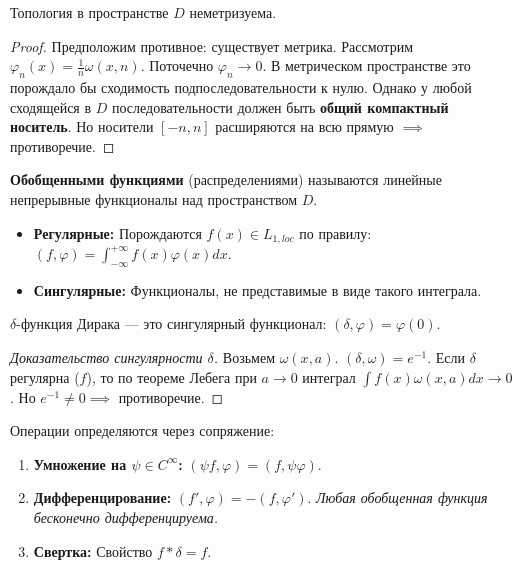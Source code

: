 \begin{proposition}[Неметризуемость]
	Топология в пространстве $D$ неметризуема.
\end{proposition}
\begin{proof}
	Предположим противное: существует метрика. Рассмотрим $\varphi_n(x) = \frac{1}{n}\omega(x, n)$. 
	Поточечно $\varphi_n \to 0$. В метрическом пространстве это порождало бы сходимость подпоследовательности к нулю. 
	Однако у любой сходящейся в $D$ последовательности должен быть \textbf{общий компактный носитель}. Но носители $[-n, n]$ расширяются на всю прямую $\implies$ противоречие.
\end{proof}

\begin{definition}
	\textbf{Обобщенными функциями} (распределениями) называются линейные непрерывные функционалы над пространством $D$.
	\begin{itemize}
		\item \textbf{Регулярные:} Порождаются $f(x) \in L_{1, loc}$ по правилу: $(f, \varphi) = \int_{-\infty}^{+\infty} f(x)\varphi(x) dx$.
		\item \textbf{Сингулярные:} Функционалы, не представимые в виде такого интеграла.
	\end{itemize}
\end{definition}

\begin{definition}
	$\delta$-функция Дирака --- это сингулярный функционал: $(\delta, \varphi) = \varphi(0)$.
\end{definition}

\begin{proof}[Доказательство сингулярности $\delta$]
	Возьмем $\omega(x, a)$. $(\delta, \omega) = e^{-1}$. 
	Если $\delta$ регулярна ($f$), то по теореме Лебега при $a \to 0$ интеграл $\int f(x)\omega(x, a) dx \to 0$. 
	Но $e^{-1} \neq 0 \implies$ противоречие.
\end{proof}

\begin{proposition}
	Операции определяются через сопряжение:
	\begin{enumerate}
		\item \textbf{Умножение на $\psi \in C^\infty$:} $(\psi f, \varphi) = (f, \psi \varphi)$.
		\item \textbf{Дифференцирование:} $(f', \varphi) = -(f, \varphi')$. 
		\textit{Любая обобщенная функция бесконечно дифференцируема.}
		\item \textbf{Свертка:} Свойство $f * \delta = f$.
	\end{enumerate}
\end{proposition}

